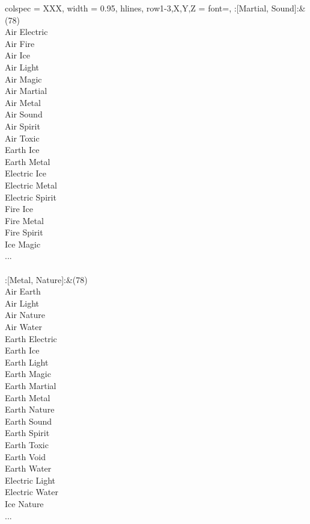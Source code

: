 \begin{longtblr}[
	caption = {2v2 Defending Weak},
	label = {2v2-Defending-Weak},
]{
	colspec = {XXX}, width = 0.95\linewidth,
	hlines,
	row{1-3,X,Y,Z} = {font=\bfseries},
}
	:[Martial, Sound]:&{(78)\\
	Air Electric \\
	Air Fire \\
	Air Ice \\
	Air Light \\
	Air Magic \\
	Air Martial \\
	Air Metal \\
	Air Sound \\
	Air Spirit \\
	Air Toxic \\
	Earth Ice \\
	Earth Metal \\
	Electric Ice \\
	Electric Metal \\
	Electric Spirit \\
	Fire Ice \\
	Fire Metal \\
	Fire Spirit \\
	Ice Magic \\
	...\\
	}\\

	:[Metal, Nature]:&{(78)\\
	Air Earth \\
	Air Light \\
	Air Nature \\
	Air Water \\
	Earth Electric \\
	Earth Ice \\
	Earth Light \\
	Earth Magic \\
	Earth Martial \\
	Earth Metal \\
	Earth Nature \\
	Earth Sound \\
	Earth Spirit \\
	Earth Toxic \\
	Earth Void \\
	Earth Water \\
	Electric Light \\
	Electric Water \\
	Ice Nature \\
	...\\
	}\\


\end{longtblr}
